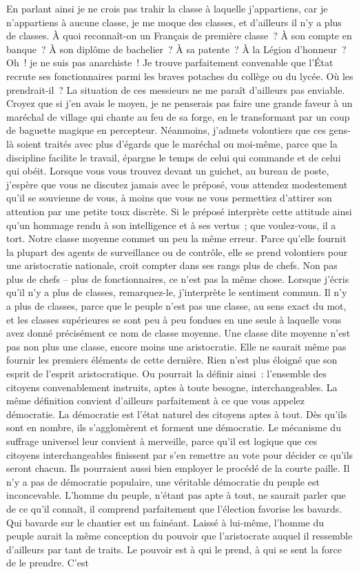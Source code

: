 \documentclass[french,twoside]{book} %
\begin{document}
En parlant ainsi je ne crois pas trahir la classe à laquelle j’appartiens, car je n’appartiens à aucune classe, je me moque des classes, et d’ailleurs il n’y a plus de classes. À quoi reconnaît-on un Français de première classe ? À son compte en banque ? À son diplôme de bachelier ? À sa patente ? À la Légion d’honneur ? Oh ! je ne suis pas anarchiste ! Je trouve parfaitement convenable que l’État recrute ses fonctionnaires parmi les braves potaches du collège ou du lycée. Où les prendrait-il ? La situation de ces messieurs ne me paraît d’ailleurs pas enviable. Croyez que si j’en avais le moyen, je ne penserais pas faire une grande faveur à un maréchal de village qui chante au feu de sa forge, en le transformant par un coup de baguette magique en percepteur. Néanmoins, j’admets volontiers que ces gens-là soient traités avec plus d’égards que le maréchal ou moi-même, parce que la discipline facilite le travail, épargne le temps de celui qui commande et de celui qui obéit. Lorsque vous vous trouvez devant un guichet, au bureau de poste, j’espère que vous ne discutez jamais avec le préposé, vous attendez modestement qu’il se souvienne de vous, à moins que vous ne vous permettiez d’attirer son attention par une petite toux discrète. Si le préposé interprète cette attitude ainsi qu’un hommage rendu à son intelligence et à ses vertus ; que voulez-vous, il a tort. Notre classe moyenne commet un peu la même erreur. Parce qu’elle fournit la plupart des agents de surveillance ou de contrôle, elle se prend volontiers pour une aristocratie nationale, croit compter dans ses rangs plus de chefs. Non pas plus de chefs – plus de fonctionnaires, ce n’est pas la même chose. Lorsque j’écris qu’il n’y a plus de classes, remarquez-le, j’interprète le sentiment commun. Il n’y a plus de classes, parce que le peuple n’est pas une classe, au sens exact du mot, et les classes supérieures se sont peu à peu fondues en une seule à laquelle vous avez donné précisément ce nom de classe moyenne. Une classe dite moyenne n’est pas non plus une classe, encore moins une aristocratie. Elle ne saurait même pas fournir les premiers éléments de cette dernière. Rien n’est plus éloigné que son esprit de l’esprit aristocratique. Ou pourrait la définir ainsi : l’ensemble des citoyens convenablement instruits, aptes à toute besogne, interchangeables. La même définition convient d’ailleurs parfaitement à ce que vous appelez démocratie. La démocratie est l’état naturel des citoyens aptes à tout. Dès qu’ils sont en nombre, ils s’agglomèrent et forment une démocratie. Le mécanisme du suffrage universel leur convient à merveille, parce qu’il est logique que ces citoyens interchangeables finissent par s’en remettre au vote pour décider ce qu’ils seront chacun. Ils pourraient aussi bien employer le procédé de la courte paille. Il n’y a pas de démocratie populaire, une véritable démocratie du peuple est inconcevable. L’homme du peuple, n’étant pas apte à tout, ne saurait parler que de ce qu’il connaît, il comprend parfaitement que l’élection favorise les bavards. Qui bavarde sur le chantier est un fainéant. Laissé à lui-même, l’homme du peuple aurait la même conception du pouvoir que l’aristocrate auquel il ressemble d’ailleurs par tant de traits. Le pouvoir est à qui le prend, à qui se sent la force de le prendre. C’est 
\end{document}
